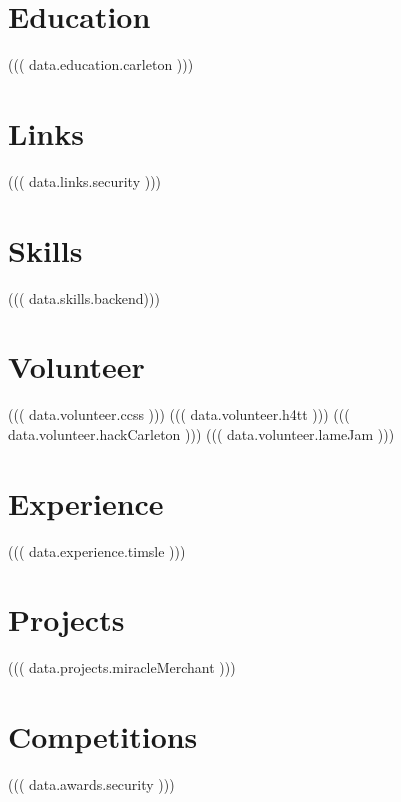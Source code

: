 \documentclass[]{deedy-resume-openfont}
\begin{document}
\vspace*{10pt}


%
%

\begin{minipage}[t]{0.33\textwidth}

\section{Education}

((( data.education.carleton )))

\section{Links}

((( data.links.security )))

\section{Skills}

((( data.skills.backend)))

\section{Volunteer}

((( data.volunteer.ccss )))
((( data.volunteer.h4tt )))
((( data.volunteer.hackCarleton )))
((( data.volunteer.lameJam )))

%
%

\end{minipage} 
\hfill
\begin{minipage}[t]{0.66\textwidth}


\section{Experience}

((( data.experience.timsle )))

\section{Projects}

((( data.projects.miracleMerchant )))

\section{Competitions}

((( data.awards.security )))

\end{minipage}
\end{document}
